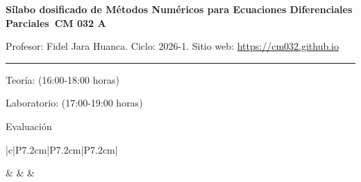 \documentclass[
	DIV=calc,
	final,
	fontsize=11pt,
	paper=landscape
]{scrartcl}
\newcommand{\CourseTitle}{Sílabo dosificado de Métodos Numéricos para Ecuaciones Diferenciales Parciales~CM 032 A}
\newcommand{\Professor}{Fidel Jara Huanca}
\newcommand{\Term}{2026-1}
\newcommand{\CourseURL}{https://cm032.github.io}
\begin{document}
\begin{center}
	\Large\bfseries\color{Primary}
	\CourseTitle

	\vspace{0.1cm}

	\small\color{Primary}
	Profesor: \Professor.\qquad
	Ciclo: \Term.\qquad
	Sitio web: \url{\CourseURL}

	\textcolor{Secondary}{\rule{\textwidth}{0.3pt}}
\end{center}

\begin{center}
	\small
	\colorbox{TeoriaColor}{\strut Teoría: (16:00-18:00 horas)}\qquad
	\colorbox{LabColor}{\strut Laboratorio: (17:00-19:00 horas)}\qquad
	\colorbox{EvalColor}{\strut Evaluación}
\end{center}

\begin{longtable}{|c|P{7.2cm}|P{7.2cm}|P{7.2cm}|}

	\hline
	                                     &
	                                       &
	                                   &
	                                       \\
	\hline
	\endhead


\end{longtable}
\end{document}
